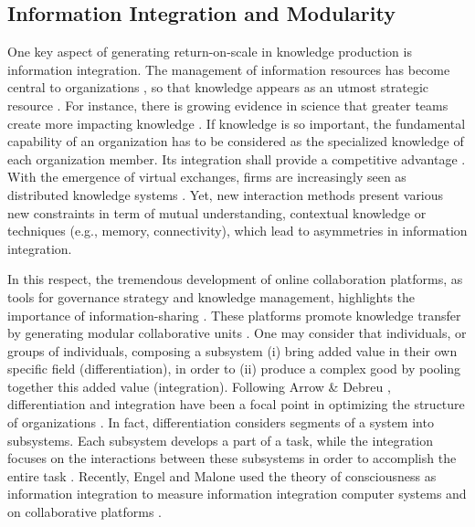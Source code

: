 \documentclass[unnumsec,webpdf,contemporary,large]{oup-authoring-template}%
\theoremstyle{thmstyleone}%
\theoremstyle{thmstyletwo}%
\theoremstyle{thmstylethree}%
\begin{document}
\subsection{Information Integration and Modularity}
\label{sec:knowledge_integration}

One key aspect of generating return-on-scale in knowledge production is information integration. The management of information resources has become central to organizations \cite{nonaka_dynamic_1994}, so that knowledge appears as an utmost strategic resource \cite{grant_prospering_1996}. For instance, there is growing evidence in science that greater teams create more impacting knowledge \cite{wuchty_increasing_2007}. If knowledge is so important, the fundamental capability of an organization has to be considered as the specialized knowledge of each organization member. Its integration shall provide a competitive advantage \cite{grant_prospering_1996,lawrence_differentiation_1967}. With the emergence of virtual exchanges, firms are increasingly seen as distributed knowledge systems \cite{majchrzak_catalyst_2018}. Yet, new interaction methods present various new constraints in term of mutual understanding, contextual knowledge or techniques (e.g., memory, connectivity), which lead to asymmetries in information integration.

In this respect, the tremendous development of online collaboration platforms, as tools for governance strategy and knowledge management, highlights the importance of information-sharing \cite{safa_information_2016}. These platforms promote knowledge transfer by generating modular collaborative units \cite{mockus_case_2000}. One may consider that individuals, or groups of individuals, composing a subsystem (i) bring added value in their own specific field (differentiation), in order to (ii) produce a complex good by pooling together this added value (integration). Following Arrow \& Debreu \cite{kenneth_j_arrow_and_gerard_debreu_existence_1954}, differentiation and integration have been a focal point in optimizing the structure of organizations \cite{ravasi_organising_2001, huang_knowledge_2003}. In fact, differentiation considers segments of a system into subsystems. Each subsystem develops a part of a task, while the integration focuses on the interactions between these subsystems in order to accomplish the entire task \cite{lawrence_differentiation_1967,engel_integrated_2018}. Recently, Engel and Malone used the theory of consciousness as information integration \cite{tononi_consciousness_1998} to measure information integration computer systems and on collaborative platforms \cite{engel_integrated_2018}.
\end{document}
